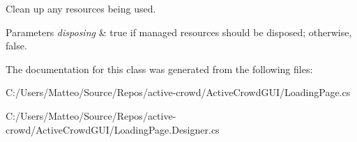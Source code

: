 Clean up any resources being used. 


\begin{DoxyParams}{Parameters}
{\em disposing} & true if managed resources should be disposed; otherwise, false.\\
\hline
\end{DoxyParams}


The documentation for this class was generated from the following files\+:\begin{DoxyCompactItemize}
\item 
C\+:/\+Users/\+Matteo/\+Source/\+Repos/active-\/crowd/\+Active\+Crowd\+G\+U\+I/Loading\+Page.\+cs\item 
C\+:/\+Users/\+Matteo/\+Source/\+Repos/active-\/crowd/\+Active\+Crowd\+G\+U\+I/Loading\+Page.\+Designer.\+cs\end{DoxyCompactItemize}
